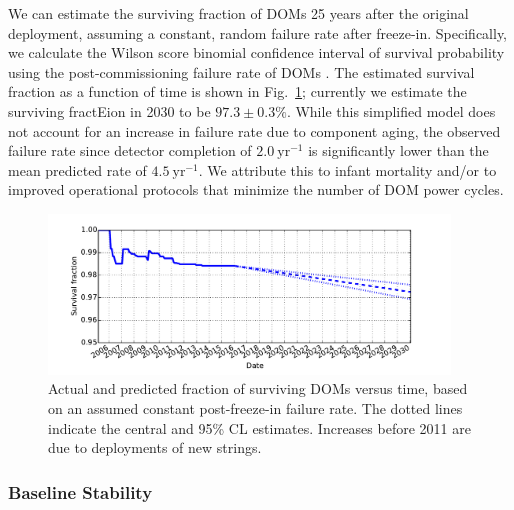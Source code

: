 We can estimate the surviving fraction of DOMs 25 years after the original
deployment, assuming a constant, random failure rate after freeze-in.
Specifically, we calculate the Wilson score binomial confidence interval of
survival probability using the post-commissioning failure rate of DOMs
\cite{Wilson_Score}.  The estimated survival fraction as a function of
time is shown in Fig.~\ref{fig:dom_survival}; currently we estimate the
surviving fractEion in 2030 to be $97.3\pm0.3\%$.  While this simplified
model does not account for an increase in failure rate due to component aging, the
observed failure rate since detector completion of $2.0~\mathrm{yr}^{-1}$ is
significantly lower than the mean predicted rate of $4.5~\mathrm{yr}^{-1}$.  We attribute
this to infant mortality and/or to improved operational protocols that
minimize the number of DOM power cycles.

\begin{figure}[!h]
 \centering
 \includegraphics[width=0.95\textwidth]{graphics/dom/reliability/dom_survival.pdf}
 \caption{Actual and predicted fraction of surviving DOMs versus time, based on an assumed
 constant post-freeze-in failure rate.  The dotted lines indicate the
 central and 95\% CL estimates.  Increases before 2011 are due
 to deployments of new strings.} 
 \label{fig:dom_survival}
\end{figure}


\subsubsection{Baseline Stability}

